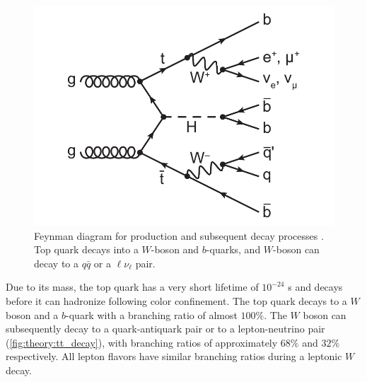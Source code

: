 \documentclass[../thesis.tex]{subfiles}
\begin{document}
\begin{figure}
\begin{center}
\includegraphics[width=\linewidth]{fig/theory_tt_decay.pdf}
\caption[Feynman diagram for \ttbar production and subsequent decay processes. Top quark decays into a $W$-boson and $b$-quarks, and $W$-boson can decay to a $q\bar{q}$ or a $\ell\nu_\ell$ pair.]{\label{fig:theory:tt_decay}Feynman diagram for \ttbar production and subsequent decay processes \citep{theory:ttH_Hbb}. Top quark decays into a $W$-boson and $b$-quarks, and $W$-boson can decay to a $q\bar{q}$ or a $\ell\nu_\ell$ pair.}
\end{center}
\end{figure}

Due to its mass, the top quark has a very short lifetime of $10^{-24}$ s \citep{PDG} and decays before it can hadronize following color confinement. The top quark decays to a $W$ boson and a $b$-quark with a branching ratio of almost $100\%$. The $W$ boson can subsequently decay to a quark-antiquark pair or to a lepton-neutrino pair (\autoref{fig:theory:tt_decay}), with branching ratios of approximately $68\%$ and $32\%$ respectively. All lepton flavors have similar branching ratios during a leptonic $W$ decay.

\end{document}

